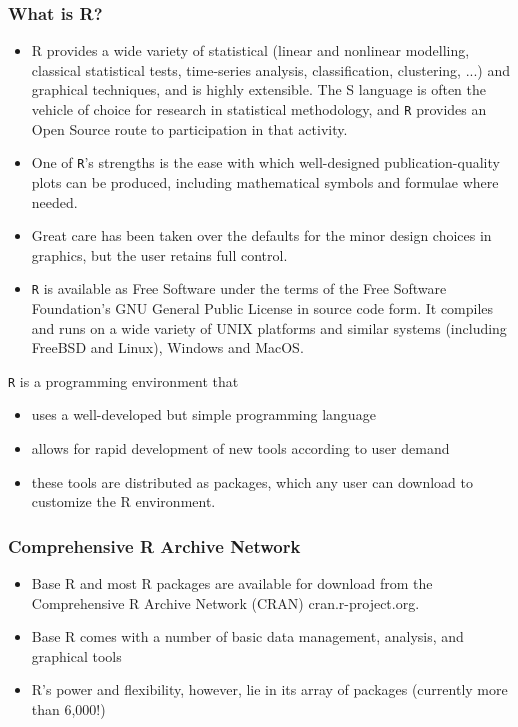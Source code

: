 \documentclass{beamer}
\begin{document}
 	\begin{frame}
 		\frametitle{What is R?}
 		\begin{itemize}
 			\item R provides a wide variety of statistical (linear and nonlinear modelling, classical statistical tests,
 			time-series analysis, classification, clustering, ...) and graphical techniques, and is highly extensible.
 			The S language is often the vehicle of choice for research in statistical methodology,
 			and \texttt{R} provides an Open Source route to participation in that activity.
 			\item One of \texttt{R}’s strengths is the ease with which well-designed publication-quality plots can be
 			produced, including mathematical symbols and formulae where needed. 
 			\item Great care has been
 			taken over the defaults for the minor design choices in graphics, but the user retains full control.
 			\item \texttt{R} is available as Free Software under the terms of the Free Software Foundation’s GNU General
 			Public License in source code form. It compiles and runs on a wide variety of UNIX platforms
 			and similar systems (including FreeBSD and Linux), Windows and MacOS.
 		\end{itemize}
 	\end{frame}
 	\begin{frame}
 		
 		\texttt{R} is a programming environment that
 		\begin{itemize}
 			\item uses a well-developed but simple programming language
 			\item allows for rapid development of new tools according to user demand
 			\item these tools are distributed as packages, which any user can download to customize the R
 			environment.
 		\end{itemize}
 	\end{frame}
 	
 	\begin{frame}
 		\frametitle{Comprehensive R Archive Network}
 		\begin{itemize}
 			\item Base R and most R packages are available for download from the Comprehensive R Archive Network
 			(CRAN) cran.r-project.org. 
 			\item Base R comes with a number of basic data management,
 			analysis, and graphical tools 
 			\item R’s power and flexibility, however, lie in its array of packages
 			(currently more than 6,000!)
 		\end{itemize}
 		
 	\end{frame}
 	
\end{document}
